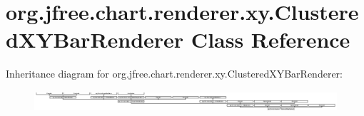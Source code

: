 \hypertarget{classorg_1_1jfree_1_1chart_1_1renderer_1_1xy_1_1_clustered_x_y_bar_renderer}{}\section{org.\+jfree.\+chart.\+renderer.\+xy.\+Clustered\+X\+Y\+Bar\+Renderer Class Reference}
\label{classorg_1_1jfree_1_1chart_1_1renderer_1_1xy_1_1_clustered_x_y_bar_renderer}
Inheritance diagram for org.\+jfree.\+chart.\+renderer.\+xy.\+Clustered\+X\+Y\+Bar\+Renderer\+:\begin{figure}[H]
\begin{center}
\leavevmode
\includegraphics[height=0.790514cm]{classorg_1_1jfree_1_1chart_1_1renderer_1_1xy_1_1_clustered_x_y_bar_renderer}
\end{center}
\end{figure}
